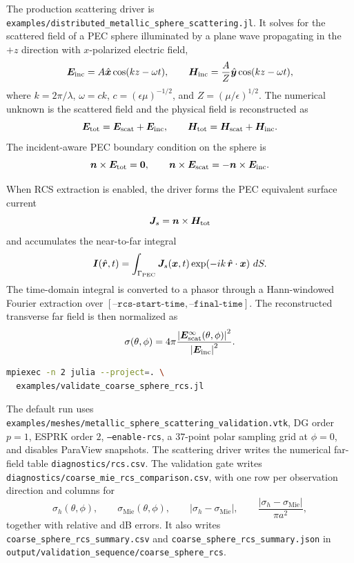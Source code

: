 \documentclass[11pt,oneside]{book}
\newcommand{\code}[1]{\texttt{#1}}
\newcommand{\vect}[1]{\boldsymbol{#1}}
\begin{document}
The production scattering driver is
\code{examples/distributed\_metallic\_sphere\_scattering.jl}. It solves for
the scattered field of a PEC sphere illuminated by a plane wave propagating in
the $+z$ direction with $x$-polarized electric field,
\[
  \vect E_{\rm inc}
  =
  A\hat{\vect x}\cos(kz-\omega t),
  \qquad
  \vect H_{\rm inc}
  =
  \frac{A}{Z}\hat{\vect y}\cos(kz-\omega t),
\]
where $k=2\pi/\lambda$, $\omega=ck$, $c=(\epsilon\mu)^{-1/2}$, and
$Z=(\mu/\epsilon)^{1/2}$. The numerical unknown is the scattered field and the
physical field is reconstructed as
\[
  \vect E_{\rm tot}=\vect E_{\rm scat}+\vect E_{\rm inc},
  \qquad
  \vect H_{\rm tot}=\vect H_{\rm scat}+\vect H_{\rm inc}.
\]
The incident-aware PEC boundary condition on the sphere is
\[
  \vect n\times\vect E_{\rm tot}=\vect 0,
  \qquad
  \vect n\times\vect E_{\rm scat}
  =
  -\vect n\times\vect E_{\rm inc}.
\]

When RCS extraction is enabled, the driver forms the PEC equivalent surface
current
\[
  \vect J_s = \vect n\times\vect H_{\rm tot}
\]
and accumulates the near-to-far integral
\[
  \vect I(\hat{\vect r},t)
  =
  \int_{\Gamma_{\rm PEC}}
  \vect J_s(\vect x,t)
  \exp\!\left(-i k\,\hat{\vect r}\cdot\vect x\right)\,dS.
\]
The time-domain integral is converted to a phasor through a Hann-windowed
Fourier extraction over
$[\code{--rcs-start-time},\code{--final-time}]$. The reconstructed transverse
far field is then normalized as
\[
  \sigma(\theta,\phi)
  =
  4\pi
  \frac{
    \left|\vect E^\infty_{\rm scat}(\theta,\phi)\right|^2
  }{
    \left|\vect E_{\rm inc}\right|^2
  }.
\]

\begin{lstlisting}[language=bash]
mpiexec -n 2 julia --project=. \
  examples/validate_coarse_sphere_rcs.jl
\end{lstlisting}

The default run uses
\code{examples/meshes/metallic\_sphere\_scattering\_validation.vtk},
DG order $p=1$, ESPRK order $2$, \code{--enable-rcs}, a $37$-point polar
sampling grid at $\phi=0$, and disables ParaView snapshots. The scattering
driver writes the numerical far-field table
\code{diagnostics/rcs.csv}. The validation gate writes
\code{diagnostics/coarse\_mie\_rcs\_comparison.csv}, with one row per
observation direction and columns for
\[
  \sigma_h(\theta,\phi),\qquad
  \sigma_{\mathrm{Mie}}(\theta,\phi),\qquad
  \left|\sigma_h-\sigma_{\mathrm{Mie}}\right|,\qquad
  \frac{\left|\sigma_h-\sigma_{\mathrm{Mie}}\right|}{\pi a^2},
\]
together with relative and dB errors. It also writes
\code{coarse\_sphere\_rcs\_summary.csv} and
\code{coarse\_sphere\_rcs\_summary.json} in
\code{output/validation\_sequence/coarse\_sphere\_rcs}.
\end{document}
